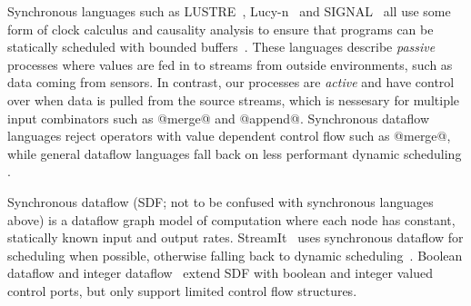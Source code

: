 

Synchronous languages such as LUSTRE~\cite{halbwachs1991synchronous}, Lucy-n~\cite{mandel2010lucy} and SIGNAL~\cite{le2003polychrony} all use some form of clock calculus and causality analysis to ensure that programs can be statically scheduled with bounded buffers~\cite{caspi1996:kahn}. These languages describe \emph{passive} processes where values are fed in to streams from outside environments, such as data coming from sensors. In contrast, our processes are \emph{active} and have control over when data is pulled from the source streams, which is nessesary for multiple input combinators such as @merge@ and  @append@.
Synchronous dataflow languages reject operators with value dependent control flow such as @merge@, while general dataflow languages fall back on less performant dynamic scheduling \cite{bouakaz2013real}.





Synchronous dataflow (SDF; not to be confused with synchronous languages above) is a dataflow graph model of computation where each node has constant, statically known input and output rates. StreamIt~\cite{thies2002streamit} uses synchronous dataflow for scheduling when possible, otherwise falling back to dynamic scheduling~\cite{soule2013dynamic}. Boolean dataflow and integer dataflow~\cite{buck1993scheduling,buck1994static} extend SDF with boolean and integer valued control ports, but only support limited control flow structures. 




